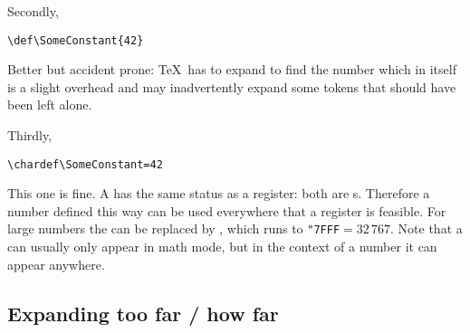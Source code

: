 \documentclass{book}
\begin{document}
Secondly,
\begin{verbatim}
\def\SomeConstant{42}
\end{verbatim}
Better but accident prone: \TeX\ has to expand to find the number
 \ldash which in itself is a slight overhead \rdash  and may inadvertently
expand some tokens that should have been left alone.

Thirdly,
\begin{verbatim}
\chardef\SomeConstant=42
\end{verbatim}
This one is fine.
A  has the same status as a 
register: both are s.
Therefore a number defined this way can be used everywhere that
a  register is feasible.
For large numbers the  can be replaced by ,
which runs to \verb>"7FFF>${}=32\,767$.
Note that a  can usually only appear
in math mode, but in the context of a number it can appear anywhere.

\subsection{Expanding too far / how far}
\end{document}
